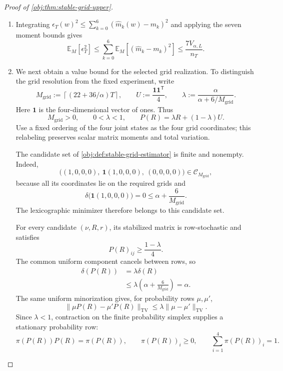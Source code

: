 \documentclass[11pt]{article}
\begin{document}
\begin{proof}[Proof of \cref{obj:thm:stable-grid-upper}]
\begin{enumerate}
\item Integrating \(\epsilon_T(w)^2\le\sum_{k=0}^{6}(\widehat m_k(w)-m_k)^2\) and applying the seven moment bounds gives
\[
\mathbb E_M[\epsilon_T^2]
\le
\sum_{k=0}^{6}\mathbb E_M[(\widehat m_k-m_k)^2]
\le
\frac{7V_{\alpha,L}}{n_T}.
\]

\item We next obtain a value bound for the selected grid realization. To distinguish the grid resolution from the fixed experiment, write
\[
M_{\mathrm{grid}}
:=
\left\lceil(22+36/\alpha)T\right\rceil,
\qquad
U:=\frac{\mathbf1\mathbf1^{\mathsf T}}4,
\qquad
\lambda:=\frac{\alpha}{\alpha+6/M_{\mathrm{grid}}}.
\]
Here \(\mathbf1\) is the four-dimensional vector of ones. Thus
\[
M_{\mathrm{grid}}>0,
\qquad
0<\lambda<1,
\qquad
P(R)=\lambda R+(1-\lambda)U.
\]
Use a fixed ordering of the four joint states as the four grid coordinates; this relabeling preserves scalar matrix moments and total variation.

The candidate set of \cref{obj:def:stable-grid-estimator} is finite and nonempty. Indeed,
\[
\bigl((1,0,0,0),\ \mathbf1(1,0,0,0),\ (0,0,0,0)\bigr)
\in\mathcal C_{M_{\mathrm{grid}}},
\]
because all its coordinates lie on the required grids and
\[
\delta\bigl(\mathbf1(1,0,0,0)\bigr)=0
\le\alpha+\frac6{M_{\mathrm{grid}}}.
\]
The lexicographic minimizer therefore belongs to this candidate set.

For every candidate \((\nu,R,r)\), its stabilized matrix is row-stochastic and satisfies
\[
P(R)_{ij}\ge\frac{1-\lambda}{4}.
\]
The common uniform component cancels between rows, so
\[
\begin{aligned}
\delta(P(R))
&=
\lambda\delta(R)\\
&\le
\lambda\left(\alpha+\frac6{M_{\mathrm{grid}}}\right)
=
\alpha.
\end{aligned}
\]
The same uniform minorization gives, for probability rows \(\mu,\mu'\),
\[
\|\mu P(R)-\mu'P(R)\|_{\mathrm{TV}}
\le
\lambda\|\mu-\mu'\|_{\mathrm{TV}}.
\]
Since \(\lambda<1\), contraction on the finite probability simplex supplies a stationary probability row:
\[
\pi(P(R))P(R)=\pi(P(R)),
\qquad
\pi(P(R))_i\ge0,
\qquad
\sum_{i=1}^{4}\pi(P(R))_i=1.
\]


\end{enumerate}
\end{proof}
\end{document}
